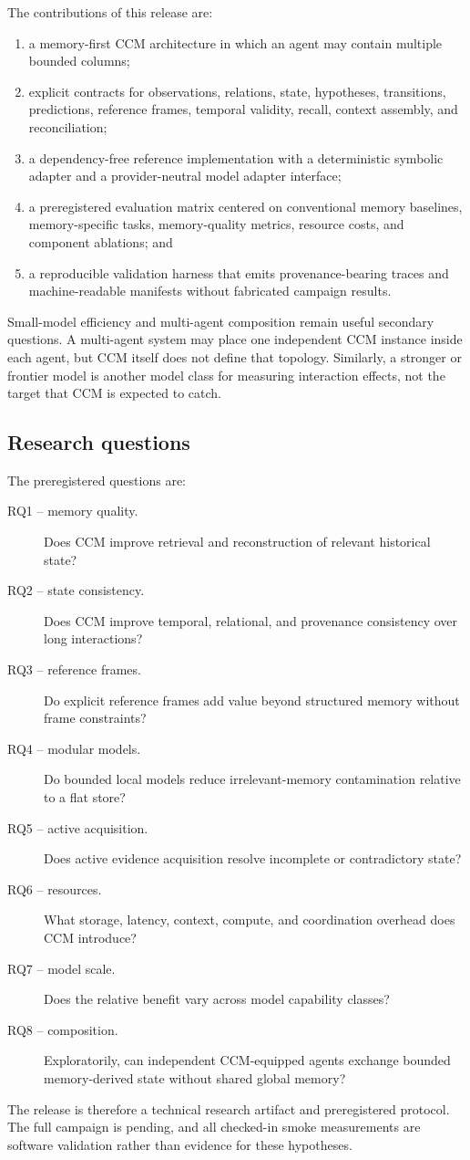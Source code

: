 The contributions of this release are:

\begin{enumerate}
  \item a memory-first CCM architecture in which an agent may contain multiple bounded columns;
  \item explicit contracts for observations, relations, state, hypotheses, transitions, predictions, reference frames, temporal validity, recall, context assembly, and reconciliation;
  \item a dependency-free reference implementation with a deterministic symbolic adapter and a provider-neutral model adapter interface;
  \item a preregistered evaluation matrix centered on conventional memory baselines, memory-specific tasks, memory-quality metrics, resource costs, and component ablations; and
  \item a reproducible validation harness that emits provenance-bearing traces and machine-readable manifests without fabricated campaign results.
\end{enumerate}

Small-model efficiency and multi-agent composition remain useful secondary questions. A multi-agent system may place one independent CCM instance inside each agent, but CCM itself does not define that topology. Similarly, a stronger or frontier model is another model class for measuring interaction effects, not the target that CCM is expected to catch.

\subsection{Research questions}

The preregistered questions are:

\begin{description}
  \item[RQ1 -- memory quality.] Does CCM improve retrieval and reconstruction of relevant historical state?
  \item[RQ2 -- state consistency.] Does CCM improve temporal, relational, and provenance consistency over long interactions?
  \item[RQ3 -- reference frames.] Do explicit reference frames add value beyond structured memory without frame constraints?
  \item[RQ4 -- modular models.] Do bounded local models reduce irrelevant-memory contamination relative to a flat store?
  \item[RQ5 -- active acquisition.] Does active evidence acquisition resolve incomplete or contradictory state?
  \item[RQ6 -- resources.] What storage, latency, context, compute, and coordination overhead does CCM introduce?
  \item[RQ7 -- model scale.] Does the relative benefit vary across model capability classes?
  \item[RQ8 -- composition.] Exploratorily, can independent CCM-equipped agents exchange bounded memory-derived state without shared global memory?
\end{description}

The release is therefore a technical research artifact and preregistered protocol. The full campaign is pending, and all checked-in smoke measurements are software validation rather than evidence for these hypotheses.
